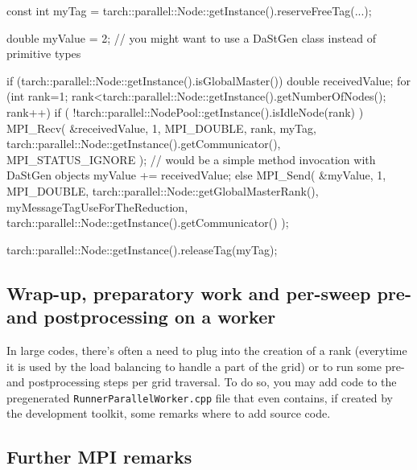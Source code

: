 \begin{code}
  const int myTag = tarch::parallel::Node::getInstance().reserveFreeTag(...);

  double myValue = 2; // you might want to use a DaStGen class instead of primitive types

  if (tarch::parallel::Node::getInstance().isGlobalMaster()) {
     double receivedValue;
     for (int rank=1; rank<tarch::parallel::Node::getInstance().getNumberOfNodes(); rank++) {
       if ( !tarch::parallel::NodePool::getInstance().isIdleNode(rank) ) {
         MPI_Recv( &receivedValue, 1, MPI_DOUBLE, rank, myTag,
           tarch::parallel::Node::getInstance().getCommunicator(),
           MPI_STATUS_IGNORE ); // would be a simple method invocation with DaStGen objects 
         myValue += receivedValue;
       }
     }
  }
  else {
    MPI_Send( &myValue, 1, MPI_DOUBLE, tarch::parallel::Node::getGlobalMasterRank(),
      myMessageTagUseForTheReduction, tarch::parallel::Node::getInstance().getCommunicator() );
  }

  tarch::parallel::Node::getInstance().releaseTag(myTag);
\end{code}


\subsection{Wrap-up, preparatory work and per-sweep pre- and postprocessing
on a worker}

In large codes, there's often a need to plug into the creation of a rank
(everytime it is used by the load balancing to handle a part of the grid) or to
run some pre- and postprocessing steps per grid traversal. 
To do so, you may add code to the pregenerated \texttt{RunnerParallelWorker.cpp}
file that even contains, if created by the development toolkit, some remarks
where to add source code.


\subsection{Further MPI remarks}

